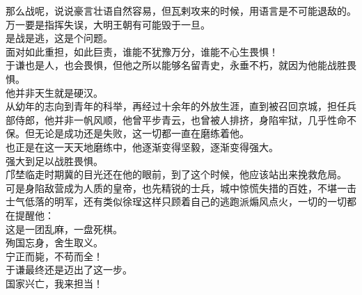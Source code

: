 \begin{multicols}{\theparacolNo}
那么战呢，说说豪言壮语自然容易，但瓦剌攻来的时候，用语言是不可能退敌的。万一要是指挥失误，大明王朝有可能毁于一旦。\\

是战是逃，这是个问题。\\

面对如此重担，如此巨责，谁能不犹豫万分，谁能不心生畏惧！\\

于谦也是人，也会畏惧，但他之所以能够名留青史，永垂不朽，就因为他能战胜畏惧。\\

他并非天生就是硬汉。\\

从幼年的志向到青年的科举，再经过十余年的外放生涯，直到被召回京城，担任兵部侍郎，他并非一帆风顺，他曾平步青云，也曾被人排挤，身陷牢狱，几乎性命不保。但无论是成功还是失败，这一切都一直在磨练着他。\\

也正是在这一天天地磨练中，他逐渐变得坚毅，逐渐变得强大。\\

强大到足以战胜畏惧。\\

邝埜临走时期冀的目光还在他的眼前，到了这个时候，他应该站出来挽救危局。\\

可是身陷敌营成为人质的皇帝，也先精锐的士兵，城中惊慌失措的百姓，不堪一击士气低落的明军，还有类似徐珵这样只顾着自己的逃跑派煽风点火，一切的一切都在提醒他：\\

这是一团乱麻，一盘死棋。\\

殉国忘身，舍生取义。\\

宁正而毙，不苟而全！\\

于谦最终还是迈出了这一步。\\

国家兴亡，我来担当！\\
\ifnum{}
	\end{multicols}
\fi
\newpage
